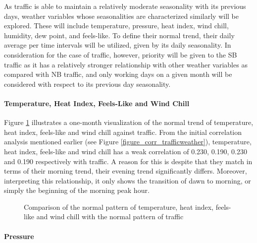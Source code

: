 As traffic is able to maintain a relatively moderate seasonality with its previous days, weather variables whose seasonalities are characterized similarly will be explored. These will include temperature, pressure, heat index, wind chill, humidity, dew point, and feels-like. To define their normal trend, their daily average per time intervals will be utilized, given by its daily seasonality. In consideration for the case of traffic, however, priority will be given to the SB traffic as it has a relatively stronger relationship with other weather variables as compared with NB traffic, and only working days on a given month will be considered with respect to its previous day seasonality.

\paragraph{Temperature, Heat Index, Feels-Like and Wind Chill}

Figure \ref{figure_traffic_vs_tempheatfeelswind} illustrates a one-month visualization of the normal trend of temperature, heat index, feels-like and wind chill against traffic. From the initial correlation analysis mentioned earlier (see Figure \ref{figure_corr_trafficweather}), temperature, heat index, feels-like and wind chill has a weak correlation of 0.230, 0.190, 0.230 and 0.190 respectively with traffic. A reason for this is despite that they match in terms of their morning trend, their evening trend significantly differs. Moreover, interpreting this relationship, it only shows the transition of dawn to morning, or simply the beginning of the morning peak hour.


\begin{figure}[h]
  \centering
  \captionsetup{justification=centering}
  \caption{Comparison of the normal pattern of temperature, heat index, feels-like and wind chill with the normal pattern of traffic}
\label{figure_traffic_vs_tempheatfeelswind}
\end{figure}



\paragraph{Pressure}

